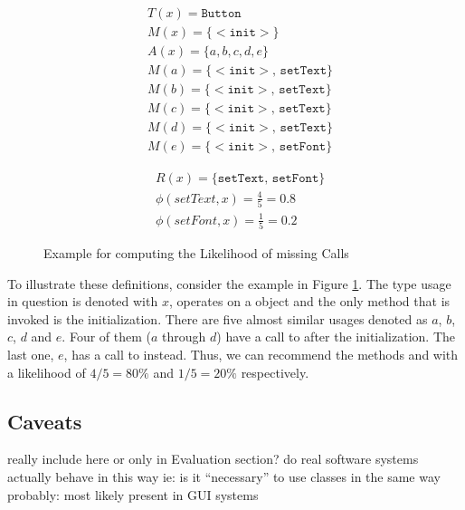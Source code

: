 \begin{figure}[h]
    \begin{subfigure}[c]{0.45\textwidth}
        \begin{align*}
& T(x) = \mathtt{Button} \\
& M(x) = \{ \mathtt{<\!\!init\!\!>} \} \\
& A(x) = \{ a, b, c, d, e \} \\
& M(a) = \{ \mathtt{<\!\!init\!\!>},\, \mathtt{setText} \} \\
& M(b) = \{ \mathtt{<\!\!init\!\!>},\, \mathtt{setText} \} \\
& M(c) = \{ \mathtt{<\!\!init\!\!>},\, \mathtt{setText} \} \\
& M(d) = \{ \mathtt{<\!\!init\!\!>},\, \mathtt{setText} \} \\
& M(e) = \{ \mathtt{<\!\!init\!\!>},\, \mathtt{setFont} \}
        \end{align*}
    \end{subfigure}
    \begin{subfigure}[c]{0.45\textwidth}
        \begin{align*}
& R(x) = \{ \mathtt{setText},\, \mathtt{setFont} \} \\
& \phi(setText, x) = \frac{4}{5} = 0.8 \\
& \phi(setFont, x) = \frac{1}{5} = 0.2
        \end{align*}
    \end{subfigure}
    \caption{Example for computing the Likelihood of missing Calls}
    \label{fig:missing_calls}
\end{figure}

To illustrate these definitions, consider the example in Figure \ref{fig:missing_calls}.
The type usage in question is denoted with $x$, operates on a  object and the only method that is invoked is the initialization.
There are five almost similar usages denoted as $a$, $b$, $c$, $d$ and $e$.
Four of them ($a$ through $d$) have a call to  after the initialization.
The last one, $e$, has a call to  instead.
Thus, we can recommend the methods  and  with a likelihood of $4/5 = 80\%$ and $1/5 = 20\%$ respectively.

\subsection{Caveats}
really include here or only in Evaluation section?
do real software systems actually behave in this way
ie: is it ``necessary'' to use classes in the same way
probably: most likely present in GUI systems

